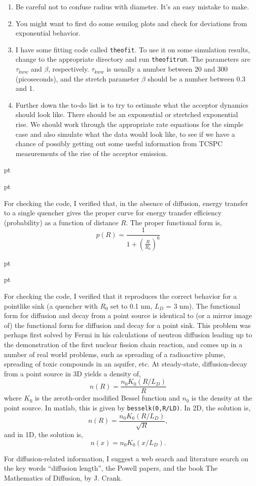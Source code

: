 \documentclass[12pt]{article}
\begin{document}
\begin{enumerate}
\item Be careful not to confuse radius with diameter.  It's an easy
  mistake to make.

\item You might want to first do some semilog plots and check for
deviations from exponential behavior.

\item I have some fitting code called {\tt theofit}.  To use it on
  some simulation results, change to the appropriate directory and run
  {\tt theofitrun}.  The parameters are $\tau_{kww}$ and $\beta$,
  respectively.  $\tau_{kww}$ is usually a number between 20 and 300
  (picoseconds), and the stretch parameter $\beta$ should be a number
  between 0.3 and 1.

\item Further down the to-do list is to try to estimate what the
  acceptor dynamics should look like.  There should be an exponential
  or stretched exponential rise.  We should work through the
  appropriate rate equations for the simple case and also simulate
  what the data would look like, to see if we have a chance of
  possibly getting out some useful information from TCSPC measurements
  of the rise of the acceptor emission.

\end{enumerate}

 pt

  pt

For checking the code, I verified that, in the absence of
diffusion, energy transfer to a single quencher gives the proper
curve for energy transfer efficiency (probability) as a function of
distance $R$.  The proper functional form is,
%
$$
p(R) = \frac{1}{1 + \left( \frac{R}{R_0} \right)^6}
$$

 pt

  pt

For checking the code, I verified that it reproduces the correct
behavior for a pointlike sink (a quencher with $R_0$ set to 0.1 nm,
$L_D$ = 3 nm). The functional form for diffusion and decay from a
point source is identical to (or a mirror image of) the functional
form for diffusion and decay for a point sink.  This problem was
perhaps first solved by Fermi in his calculations of neutron diffusion
leading up to the demonstration of the first nuclear fission chain
reaction, and comes up in a number of real world problems, such as
spreading of a radioactive plume, spreading of toxic compounds in an
aquifer, etc.  At steady-state, diffusion-decay from a point source in
3D yields a density of,
%
$$
n(R) = \frac{n_0 K_0(R/L_D)}{R}
$$
%
where $K_0$ is the zeroth-order modified Bessel function and $n_0$ is
the density at the point source.  In {\sc matlab}, this is given by
{\tt besselk(0,R/LD)}.  In 2D, the solution is,
%
$$
n(R) = \frac{n_0 K_0(R/L_D)}{\sqrt{R}},
$$
%
and in 1D, the solution is,
%
$$
n(x) = n_0 K_0(x/L_D).
$$
%

For diffusion-related information, I suggest a web search and literature search
on the key words ``diffusion length'', the Powell papers, and the book
The Mathematics of Diffusion, by J. Crank.
\end{document}
